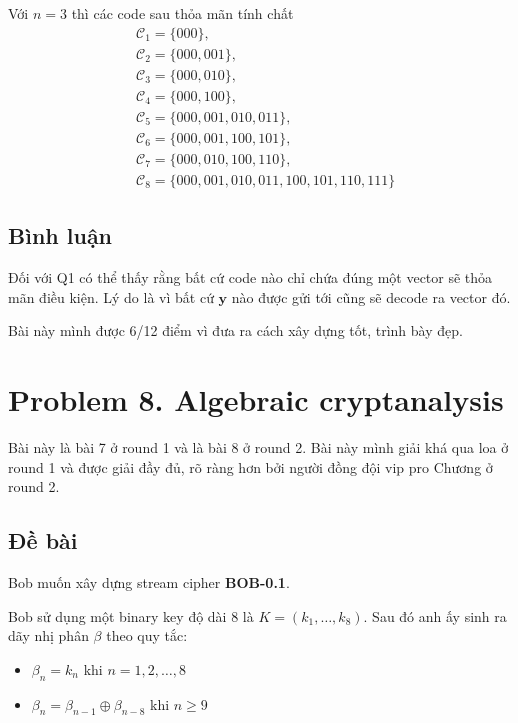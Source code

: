 \begin{example}
    Với $n=3$ thì các code sau thỏa mãn tính chất
    \begin{align*}
        & \mathcal{C}_1 = \{ 000 \}, \\
        & \mathcal{C}_2 = \{ 000, 001 \}, \\
        & \mathcal{C}_3 = \{ 000, 010 \}, \\
        & \mathcal{C}_4 = \{ 000, 100 \}, \\
        & \mathcal{C}_5 = \{ 000, 001, 010, 011 \}, \\
        & \mathcal{C}_6 = \{ 000, 001, 100, 101 \}, \\
        & \mathcal{C}_7 = \{ 000, 010, 100, 110 \}, \\
        & \mathcal{C}_8 = \{ 000, 001, 010, 011, 100, 101, 110, 111 \}
    \end{align*}
\end{example}

\subsection*{Bình luận}

Đối với Q1 có thể thấy rằng bất cứ code nào chỉ chứa đúng một vector sẽ thỏa mãn điều kiện. Lý do là vì bất cứ $\bm{y}$ nào được gửi tới cũng sẽ decode ra vector đó.

Bài này mình được 6/12 điểm vì đưa ra cách xây dựng tốt, trình bày đẹp.

\section*{Problem 8. Algebraic cryptanalysis}

Bài này là bài 7 ở round 1 và là bài 8 ở round 2. Bài này mình giải khá qua loa ở round 1 và được giải đầy đủ, rõ ràng hơn bởi người đồng đội vip pro Chương ở round 2.

\subsection*{Đề bài}

Bob muốn xây dựng stream cipher \textbf{BOB-0.1}.

Bob sử dụng một binary key độ dài 8 là $K = (k_1, \ldots, k_8)$. Sau đó anh ấy sinh ra dãy nhị phân $\beta$ theo quy tắc:

\begin{itemize}
    \item $\beta_n = k_n$ khi $n = 1, 2, \ldots, 8$
    \item $\beta_n = \beta_{n-1} \oplus \beta_{n-8}$ khi $n \geqslant 9$
\end{itemize}

